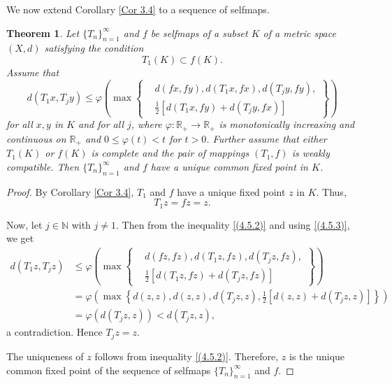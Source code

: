 \documentclass[a4paper,12pt,oneside]{article}
\newtheorem{theorem}{Theorem}[section]
\numberwithin{equation}{section}
\begin{document}
We now extend Corollary \eqref{Cor 3.4} to a sequence of selfmaps.

\begin{theorem} \label{thrm 4.5}
    Let $\{T_{n}\}_{n=1}^{\infty}$ and $f$ be selfmaps of a subset $K$ of a metric space $(X, d)$ satisfying the condition
\begin{equation}\label{(4.5.1)}
T_{1}(K) \subset f(K).
\end{equation}
Assume that
\begin{equation} \label{(4.5.2)}
d(T_{1}x, T_{j}y) \leq \varphi\left(\max\left\{
\begin{aligned}
&d(fx, fy), d(T_{1}x, fx), d(T_{j}y, fy), \\
&\tfrac{1}{2}[d(T_{1}x, fy) + d(T_{j}y, fx)]
\end{aligned}
\right\}\right)
\end{equation}
for all $x, y$ in $K$ and for all $j$, where $\varphi: \mathbb{R}_{+} \to \mathbb{R}_{+}$ is monotonically increasing and continuous on $\mathbb{R}_{+}$ and $0 \leq \varphi(t) < t$ for $t > 0$. Further assume that either $T_{1}(K)$ or $f(K)$ is complete and the pair of mappings $(T_{1}, f)$ is weakly compatible. Then $\{T_{n}\}_{n=1}^{\infty}$ and $f$ have a unique common fixed point in $K$.
\end{theorem}

\begin{proof}
    By Corollary \eqref{Cor 3.4}, $T_{1}$ and $f$ have a unique fixed point $z$ in $K$. Thus,
\begin{equation} \label{(4.5.3)}
T_{1}z = fz = z.
\end{equation}

Now, let $j \in \mathbb{N}$ with $j \neq 1$. Then from the inequality \eqref{(4.5.2)} and using \eqref{(4.5.3)}, we get
\begin{align*}
d(T_{1}z, T_{j}z) &\leq \varphi\left(\max\left\{
\begin{aligned}
&d(fz, fz), d(T_{1}z, fz), d(T_{j}z, fz), \\
&\tfrac{1}{2}[d(T_{1}z, fz) + d(T_{j}z, fz)]
\end{aligned}
\right\}\right) \\
&= \varphi\left(\max\left\{d(z, z), d(z, z), d(T_{j}z, z), \tfrac{1}{2}[d(z, z) + d(T_{j}z, z)]\right\}\right) \\
&= \varphi(d(T_{j}z, z)) < d(T_{j}z, z),
\end{align*}
a contradiction. Hence $T_{j}z = z$.

The uniqueness of $z$ follows from inequality \eqref{(4.5.2)}. Therefore, $z$ is the unique common fixed point of the sequence of selfmaps $\{T_{n}\}_{n=1}^{\infty}$ and $f$.
\end{proof}
\end{document}
